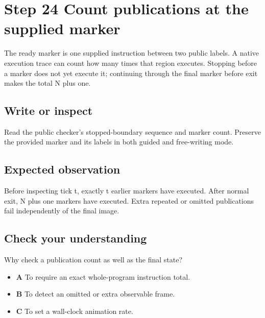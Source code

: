 \section{Step 24 Count publications at the supplied marker}\label{ball-s24}

The ready marker is one supplied instruction between two public labels. A native execution trace can count how many times that region executes. Stopping before a marker does not yet execute it; continuing through the final marker before exit makes the total N plus one.

\subsection{Write or inspect}
Read the public checker’s stopped-boundary sequence and marker count. Preserve the provided marker and its labels in both guided and free-writing mode.

\subsection{Expected observation}
Before inspecting tick t, exactly t earlier markers have executed. After normal exit, N plus one markers have executed. Extra repeated or omitted publications fail independently of the final image.

\subsection{Check your understanding}
Why check a publication count as well as the final state?

\begin{itemize}
  \item \textbf{A} To require an exact whole-program instruction total.
  \item \textbf{B} To detect an omitted or extra observable frame.
  \item \textbf{C} To set a wall-clock animation rate.
\end{itemize}
